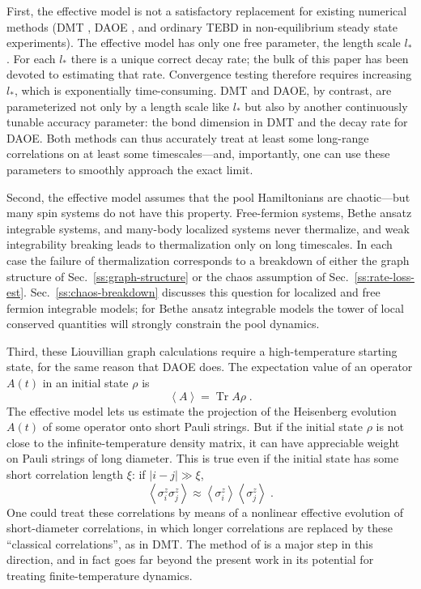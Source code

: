 \documentclass[aps,prb,nofootinbib,twocolumn,balancelastpage,amsmath,amssymb,floatfix,superscriptaddress,]{revtex4-1}
\newcommand{\tr}{\operatorname{Tr}}
\newcommand{\expct}[1]{\left\langle #1 \right\rangle}
\begin{document}
First, the effective model is not a satisfactory replacement for existing numerical methods
(DMT \cite{white_quantum_2018,ye_emergent_2019}, DAOE \cite{rakovszky_dissipation-assisted_2020}, and ordinary TEBD in non-equilibrium steady state experiments).
The effective model has only one free parameter,
the length scale $l_*$.
For each $l_*$ there is a unique correct decay rate;
the bulk of this paper has been devoted to estimating that rate.
Convergence testing therefore
requires increasing $l_*$, which is exponentially time-consuming.
DMT and DAOE, by contrast, are parameterized not only by a length scale like $l_*$
but also by another continuously tunable accuracy parameter:
the bond dimension in DMT and the decay rate for DAOE.
Both methods can thus accurately treat at least some long-range correlations
on at least some timescales---and, importantly, one can use these parameters to smoothly approach the exact limit.

Second, the effective model assumes that the pool Hamiltonians are chaotic---but many spin systems do not have this property.
Free-fermion systems, Bethe ansatz integrable systems, and many-body localized systems
never thermalize,
and weak integrability breaking leads to thermalization only on long timescales.
In each case the failure of thermalization corresponds to a breakdown of either the graph structure of Sec.~\ref{ss:graph-structure} or the chaos assumption of Sec.~\ref{ss:rate-loss-est}.
 Sec.~\ref{ss:chaos-breakdown} discusses this question for localized and free fermion integrable models;
for Bethe ansatz integrable models
the tower of local conserved quantities will strongly constrain the pool dynamics.

Third, these Liouvillian graph calculations require a high-temperature starting state,
for the same reason that DAOE does.
The expectation value of an operator $A(t)$ in an initial state $\rho$ is
\[ \expct{A} = \tr A \rho\;. \]
The effective model lets us estimate the projection of the Heisenberg evolution $A(t)$
of some operator onto short Pauli strings.
But if the initial state $\rho$ is not close to the infinite-temperature density matrix,
it can have appreciable weight on Pauli strings of long diameter.
This is true even if the initial state has some short correlation length $\xi$:
if $|i - j| \gg \xi$,
\[ \expct{\sigma^z_i \sigma^z_j} \approx \expct{\sigma^z_i}\expct{\sigma^z_j}\;. \]
One could treat these correlations by means of a nonlinear effective evolution of short-diameter correlations,
in which longer correlations are replaced by these ``classical correlations'',
as in DMT.
The method of  is a major step in this direction,
and in fact goes far beyond the present work in its potential for treating finite-temperature dynamics.
\end{document}
